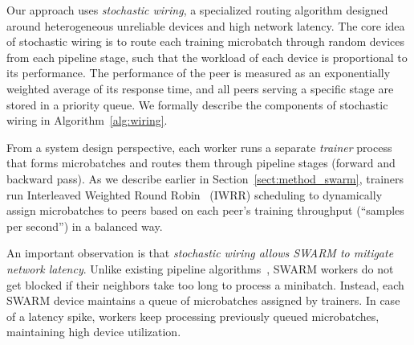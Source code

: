 Our approach uses \textit{stochastic wiring}, a specialized routing algorithm designed around heterogeneous unreliable devices and high network latency. The core idea of stochastic wiring is to route each training microbatch through random devices from each pipeline stage, such that the workload of each device is proportional to its performance.
The performance of the peer is measured as an exponentially weighted average of its response time, and all peers serving a specific stage are stored in a priority queue. 
We formally describe the components of stochastic wiring in Algorithm~\ref{alg:wiring}.

From a system design perspective, each worker runs a separate \textit{trainer} process that forms microbatches and routes them through pipeline stages (forward and backward pass). As we describe earlier in Section~\ref{sect:method_swarm}, trainers run Interleaved Weighted Round Robin~\citep{iwrr,interleaved_round_robin} (IWRR) scheduling to dynamically assign microbatches to peers based on each peer's training throughput (``samples per second'') in a balanced way.


An important observation is that \textit{stochastic wiring allows SWARM to mitigate network latency}. Unlike existing pipeline algorithms~\citep{huang2019gpipe}, SWARM workers do not get blocked if their neighbors take too long to process a minibatch. Instead, each SWARM device maintains a queue of microbatches assigned by trainers. In case of a latency spike, workers keep processing previously queued microbatches, maintaining high device utilization.

